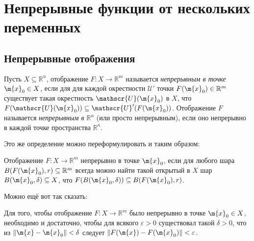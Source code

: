 \chapter{Непрерывные функции от нескольких переменных}


\section{Непрерывные отображения}

\begin{definition}
Пусть $X \subseteq \mathbb{R}^n$, отображение $F:X \to \mathbb{R}^m$ называется \textit{непрерывным в точке} $\m{x}_0 \in X$, если для для каждой окрестности $\mathscr{U}'$ точки $F(\m{x}_0) \in \mathbb{R}^m$ существует такая окрестность $\mathscr{U}(\m{x}_0)$ в $X$, что $F(\mathscr{U}(\m{x}_0)) \subseteq \mathscr{U}'(F(\m{x}_0))$. Отображение $F$ называется \textit{непрерывным в $\mathbb{R}^n$} (или просто непрерывным), если оно непрерывно в каждой точке пространства $\mathbb{R}^n.$
\end{definition}

Это же определение можно переформулировать и таким образом:

\begin{definition}
    Отображение $F:X \to \mathbb{R}^m$ непрерывно в точке $\m{x}_0$, если для любого шара $B(F(\m{x}_0), r) \subseteq \mathbb{R}^m$ всегда можно найти такой открытый в $X$ шар $B(\m{x}_0, \delta) \subseteq X$, что $F(B(\m{x}_0, \delta)) \subseteq B(F(\m{x}_0), r)$.
\end{definition}

Можно ещё вот так сказать:

\begin{definition}\label{reform_of_cont}
    Для того, чтобы отображение $F:X \to \mathbb{R}^m$ было непрерывно в точке $\m{x}_0 \in X$, необходимо и достаточно, чтобы для всякого $\varepsilon>0$ существовал такой $\delta >0$, что из $\|\m{x} - \m{x}_0\|<\delta$ следует $\| F(\m{x}) - F(\m{x}_0) \|<\varepsilon$.
\end{definition}

